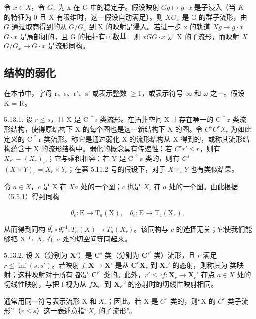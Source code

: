 令 \(x \in X\)，令 \(G_x\) 为 x 在 G 中的稳定子。假设映射 \(G\)\(g \mapsto g \cdot x\) 是子浸入（当 \(K\) 的特征为 0 且 X 有限维时，这一假设自动满足）。则 \(X\)\(G_x\) 是 G 的群子流形，由 \(G\) 通过取商得到的从 \(G/G_x\) 到 X 的映射是浸入。若进一步 x 的轨道 \(X\)\(g \mapsto g \cdot x\)\(G \cdot x\) 是局部闭的，且 G 的拓扑有可数基，则 \(x\)\(G\)\(G \cdot x\) 是 X 的子流形，而映射 \(X\)\(G/G_x \to G \cdot x\) 是流形同构。

\subsection{结构的弱化}

在本节中，字母 r、s、r'、s' 或表示整数 \(\geqslant1\)，或表示符号 \(\infty\) 和 \(\omega\) 之一。假设 K = R。

5.13.1. 设 \(r \leqslant s\)，且 X 是 C＾s 类流形。在拓扑空间 X 上存在唯一的 C＾r 类流形结构，使得原结构下 X 的每个图也是这一新结构下 X 的图。令 \(C^s\)\(C^r\)\(X_r\) 为如此定义的 C＾r 类流形。称它是通过弱化 X 的流形结构从 X 得到的，或称其流形结构蕴含于 X 的流形结构中。弱化的概念具有传递性：若 \(C^r\)\(r' \leqslant r\)，则有 \(X_{r'} = (X_r)_{r'}\)；它与乘积相容：若 Y 是 C＾s 类的，则有 \(C^s\)\((X \times Y)_r = X_r \times Y_r\)；在第 5.11.2 号的假设下，对于 \(X \times_s Y\) 也有类似结果。

令 \(a\in X\)，\(c\) 是 X 在 \(X\)\(a\) 处的一个图；\(c\) 也是 \(X_r\) 在 \(a\) 处的一个图。由此根据（5.5.1）得到同构

\[
\theta_ {c}: \mathrm{E} \rightarrow \mathrm{T} _ {a} (\mathrm{X}), \quad \theta_ {c} ^ {\prime}: \mathrm{E} \rightarrow \mathrm{T} _ {a} (\mathrm{X} _ {r}),
\]

从而得到同构 \(\theta_{c}^{\prime}\circ\theta_{c}^{-1}:T_{a}(X)\to T_{a}(X_{r})\)。该同构与 \(c\) 的选择无关；它使我们能够把 X 与 \(X_{r}\) 在 \(a\) 处的切空间等同起来。

5.13.2. 设 X（分别为 \(\mathbf{X}'\)）是 \(\mathbf{C}^s\) 类（分别为 \(\mathbf{C}^{s'}\) 类）流形，且 \(r\) 满足 \(r \leqslant \inf(s, s')\)。若映射 \(f: \mathbf{X} \to \mathbf{X}'\) 是从 \(\mathbf{C}^r\)\(\mathbf{X}_r\) 到 \(\mathbf{X}_r'\) 的态射，则称其为  类映射；这种映射对于所有  都是 \(\mathbf{C}^{r'}\) 类的。此外，\(r' \leqslant r\)\(f: \mathbf{X}_r \to \mathbf{X}_r'\) 在点 \(a \in X\) 处的切线性映射，与把 f 视为从 \(f\)\(\mathbf{X}_{r'}\) 到 \(\mathbf{X}_{r'}'\) 的态射时的切线性映射相同。

通常用同一符号表示流形 X 和 \(X_{r}\)；因此，若 X 是 \(C^{s}\) 类的，则“X 的 \(C^{r}\) 类子流形”（\(r \leqslant s\)）这一表述意指“\(X_{r}\) 的子流形”。

